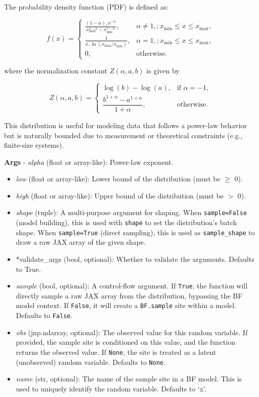 \documentclass[
  letterpaper,
  DIV=11,
  numbers=noendperiod]{scrartcl}
\begin{document}
The probability density function (PDF) is defined as:

\[
 f(x) = \begin{cases}
 \displaystyle \frac{(1-\alpha), x^{-\alpha}}{x_{\max}^{1-\alpha} - x_{\min}^{1-\alpha}}, & \alpha \neq 1, ; x_{\min} \le x         \le x_{\max},\\
 \displaystyle \frac{1}{x, \ln\left(x_{\max}/x_{\min}\right)}, & \alpha = 1, ; x_{\min} \le x \le x_{\max},\\
 0, & \text{otherwise}.
 \end{cases}
 \]

where the normalization constant \(Z(\alpha,a,b)\) is given by

\[
 Z(\alpha,a,b) =
 \begin{cases}
 \log(b) - \log(a), & \text{if } \alpha = -1, \\
 \dfrac{b^{1+\alpha} - a^{1+\alpha}}{1+\alpha}, & \text{otherwise}.
 \end{cases}
 \]

This distribution is useful for modeling data that follows a power-law
behavior but is naturally bounded due to measurement or theoretical
constraints (e.g., finite-size systems).

\textbf{Args} - \emph{alpha} (float or array-like): Power-law exponent.

\begin{itemize}
\item
  \emph{low} (float or array-like): Lower bound of the distribution
  (must be \(≥\) 0).
\item
  \emph{high} (float or array-like): Upper bound of the distribution
  (must be \(>\) 0).
\item
  \emph{shape} (tuple): A multi-purpose argument for shaping. When
  \texttt{sample=False} (model building), this is used with
  \texttt{shape} to set the distribution's batch shape. When
  \texttt{sample=True} (direct sampling), this is used as
  \texttt{sample\_shape} to draw a raw JAX array of the given shape.
\item
  *validate\_args (bool, optional): Whether to validate the arguments.
  Defaults to True.
\item
  \emph{sample} (bool, optional): A control-flow argument. If
  \texttt{True}, the function will directly sample a raw JAX array from
  the distribution, bypassing the BF model context. If \texttt{False},
  it will create a \texttt{BF.sample} site within a model. Defaults to
  \texttt{False}.
\item
  \emph{obs} (jnp.ndarray, optional): The observed value for this random
  variable. If provided, the sample site is conditioned on this value,
  and the function returns the observed value. If \texttt{None}, the
  site is treated as a latent (unobserved) random variable. Defaults to
  \texttt{None}.
\item
  \emph{name} (str, optional): The name of the sample site in a BF
  model. This is used to uniquely identify the random variable. Defaults
  to `x'.
\end{itemize}
\end{document}
